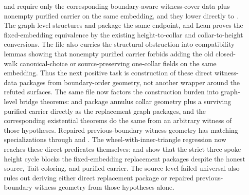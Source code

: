 \documentclass[11pt]{article}
\begin{document}
 and
 require only the
corresponding boundary-aware witness-cover data plus nonempty purified carrier
on the same embedding, and they lower directly to
.  The graph-level
structures  and
 package the same endpoint,
and Lean proves the fixed-embedding equivalence
by the existing height-to-collar and collar-to-height conversions.  The file
also curries the structural obstruction into compatibility lemmas showing that
nonempty purified carrier forbids adding the old closed-walk canonical-choice
or source-preserving one-collar fields on the same embedding.  Thus the next
positive task is construction of these direct witness-data packages from
boundary-order geometry, not another wrapper around the refuted surfaces.  The
same file now factors the construction burden into graph-level bridge theorems:
and
package annulus collar geometry plus a surviving purified carrier directly as
the replacement graph packages, and the corresponding existential theorems do
the same from an arbitrary witness of those hypotheses.  Repaired
previous-boundary witness geometry has matching specializations through
and
.
The wheel-with-inner-triangle regression now reaches these direct predicates
themselves:
and
show that the strict three-spoke height cycle blocks the fixed-embedding
replacement packages despite the honest source, Tait coloring, and purified
carrier.  The source-level failed universal
also rules out deriving either direct replacement package or repaired
previous-boundary witness geometry from those hypotheses alone.
\end{document}
